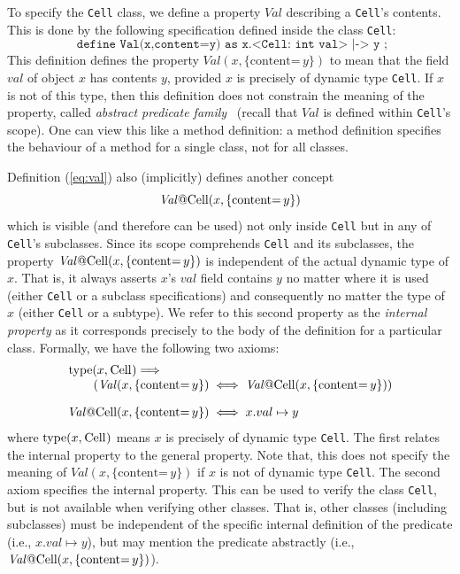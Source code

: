 \documentclass[11pt]{article}
\newcommand{\Val}{\mathit{Val}}
\newcommand{\content}[1]{\{\text{content=} \, #1 \}}
\def\J{\lstinline}
\newcommand{\JS}[1]{$\mathit{#1}$}
\begin{document}
To specify the \J~Cell~ class, we define a property \JS{Val} describing a \J~Cell~'s contents.  This is done by  the following 
specification defined inside the class \J~Cell~:
%
\begin{equation}
\label{eq:val}
\texttt{  define Val(x,content=y) as x.<Cell: int val> |-> y ;}
\end{equation}
%
This definition defines the property $\Val(x,\content y)$ to mean that the
field \JS{val} of object $x$ has contents $y$, provided $x$ is
precisely of dynamic type \J~Cell~.  If $x$ is not of this type,
then this definition does not constrain the meaning of the property,
called \emph{abstract predicate family}~\cite{parkinson05} (recall that $\Val$ is defined within \J~Cell~'s scope).  One can
view this like a method definition: a method definition specifies the
behaviour of a method for a single class, not for all classes.

Definition (\ref{eq:val}) also (implicitly) defines another concept 
\[
\Val\J~@Cell~(x,\content y)
\]
which  is visible (and therefore can be used) not only inside \J~Cell~ but in any of \J~Cell~'s subclasses.
Since its scope comprehends  \J~Cell~ and its subclasses, the property $\Val\J~@Cell~(x,\content y)$
is independent of the actual dynamic type of \JS{x}. That is, it always asserts \JS{x}'s
\JS{val} field contains \JS{y} no matter where it is used (either \J~Cell~ or a subclass specifications)
and consequently no matter the type of \JS{x} (either \J~Cell~ or a subtype).  
We refer
to this second property as the \emph{internal property} as it
corresponds precisely to the body of the definition for a particular
class. Formally, we have the following two axioms:
\[
\begin{array}{@{}r@{\;}c@{\;}l@{}}
\begin{array}[b]{@{}l@{}}
\J~type~(x, \J~Cell~) \Longrightarrow \\
\mbox{}\qquad(\Val(x,\content y)
\end{array} & \iff & \Val\J~@Cell~(x,\content y))
\\[1em]
\Val\J~@Cell~(x,\content y) &\iff& x.val \mapsto y
\end{array}
\]
where $\J~type~(x, \J~Cell~)$ means $x$ is precisely of dynamic type
\J~Cell~.
%
The first relates the internal property to the general property.  Note
that, this does not specify the meaning of $\Val(x,\content y)$ if $x$
is not of dynamic type \J~Cell~.  The second axiom specifies the internal
property.  This can be used to verify the class  \J~Cell~, but is not available
when verifying other classes.  That is, other classes (including
subclasses) must be independent of the specific internal definition of
the predicate (i.e., $ x.val \mapsto y$),
 but may mention the predicate abstractly (i.e., $\Val\J~@Cell~(x,\content y)$).
\end{document}
